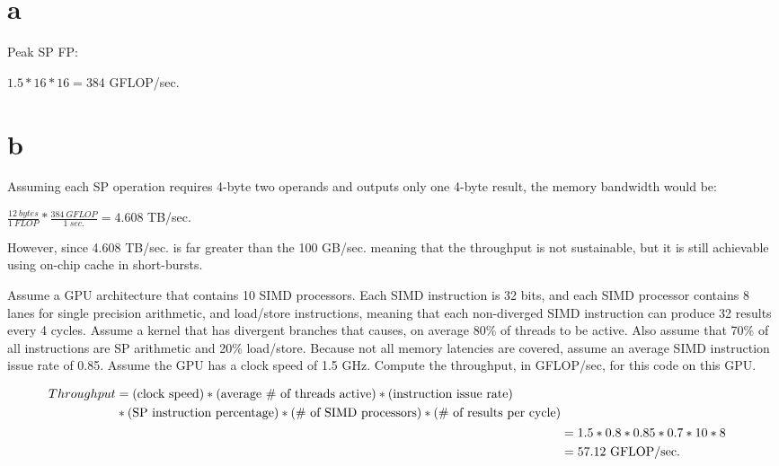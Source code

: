 	\part{a}
		Peak SP FP:\par
		$1.5 * 16 * 16 = 384$ GFLOP/sec.
	
	\part{b}
		Assuming each SP operation requires 4-byte two operands and outputs only one 4-byte result, the memory bandwidth would be:\par
		$\frac{12\:bytes}{1\:FLOP} * \frac{384\: GFLOP}{1\:sec.} = 4.608$ TB/sec.\par
		However, since 4.608 TB/sec. is far greater than the 100 GB/sec. meaning that the throughput is not sustainable, but it is still achievable using on-chip cache in short-bursts.\par
	
	

	Assume a GPU architecture that contains 10 SIMD processors. Each SIMD instruction is 32 bits, and each SIMD processor contains 8 lanes for single precision arithmetic, and load/store instructions, meaning that each non-diverged SIMD instruction can produce 32 results every 4 cycles. Assume a kernel that has divergent branches that causes, on average 80\% of threads to be active. Also assume that 70\% of all instructions are SP arithmetic and 20\% load/store. Because not all memory latencies are covered, assume an average SIMD instruction issue rate of 0.85. Assume the GPU has a clock speed of 1.5 GHz. Compute the throughput, in GFLOP/sec, for this code on this GPU.\par
	
	\begin{align*}
	\begin{split}
	Throughput &= \textnormal{(clock speed)} * \textnormal{(average \# of threads active)} * \textnormal{(instruction issue rate)} \\
	&* \textnormal{(SP instruction percentage)} * \textnormal{(\# of SIMD processors)} * \textnormal{(\# of results per cycle)}\\
	\end{split}\\
	&= 1.5 * 0.8 * 0.85 * 0.7 * 10 * 8\\
	&= 57.12 \textnormal{ GFLOP/sec.}
	\end{align*}

